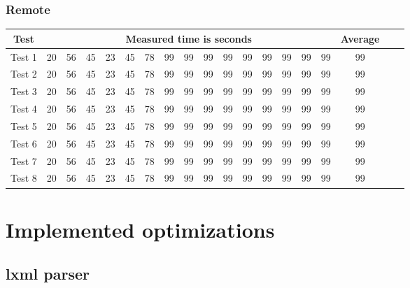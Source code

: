 \subsubsection{Remote}
\begin{center}
    \begin{tabular}{| c | c | c | c | c | c | c | c | c | c | c | c | c | c | c | c | c | c | c |}
    \hline
    Test & \multicolumn{15}{|c|}{Measured time is seconds} & Average \\ \hline
    Test 1 & 20 & 56 & 45 & 23 & 45 & 78 & 99 & 99 & 99 & 99 & 99 & 99 & 99 & 99 & 99 & 99 \\ \hline
    Test 2 & 20 & 56 & 45 & 23 & 45 & 78 & 99 & 99 & 99 & 99 & 99 & 99 & 99 & 99 & 99 & 99 \\ \hline
    Test 3 & 20 & 56 & 45 & 23 & 45 & 78 & 99 & 99 & 99 & 99 & 99 & 99 & 99 & 99 & 99 & 99 \\ \hline
    Test 4 & 20 & 56 & 45 & 23 & 45 & 78 & 99 & 99 & 99 & 99 & 99 & 99 & 99 & 99 & 99 & 99 \\ \hline
    Test 5 & 20 & 56 & 45 & 23 & 45 & 78 & 99 & 99 & 99 & 99 & 99 & 99 & 99 & 99 & 99 & 99 \\ \hline
    Test 6 & 20 & 56 & 45 & 23 & 45 & 78 & 99 & 99 & 99 & 99 & 99 & 99 & 99 & 99 & 99 & 99 \\ \hline
    Test 7 & 20 & 56 & 45 & 23 & 45 & 78 & 99 & 99 & 99 & 99 & 99 & 99 & 99 & 99 & 99 & 99 \\ \hline
    Test 8 & 20 & 56 & 45 & 23 & 45 & 78 & 99 & 99 & 99 & 99 & 99 & 99 & 99 & 99 & 99 & 99 \\ \hline
    \end{tabular}
\end{center}
\section{Implemented optimizations}
\subsection{lxml parser}
